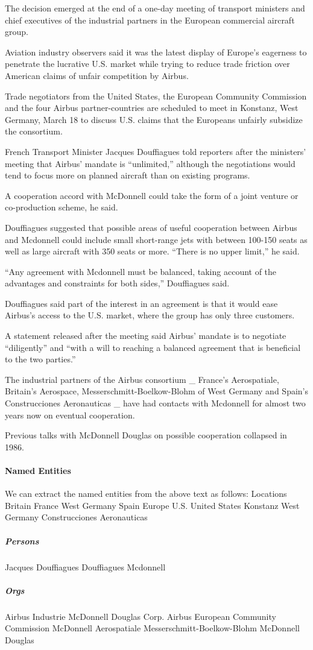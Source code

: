 \documentclass{mprop}
\begin{document}
The decision emerged at the end of a one-day meeting of transport ministers and chief executives of the industrial partners in the European commercial aircraft group.

Aviation industry observers said it was the latest display of Europe's eagerness to penetrate the lucrative U.S. market while trying to reduce trade friction over American claims of unfair competition by Airbus.

Trade negotiators from the United States, the European Community Commission and the four Airbus partner-countries are scheduled to meet in Konstanz, West Germany, March 18 to discuss U.S. claims that the Europeans unfairly subsidize the consortium.

French Transport Minister Jacques Douffiagues told reporters after the ministers' meeting that Airbus' mandate is ``unlimited,'' although the negotiations would tend to focus more on planned aircraft than on existing programs.

A cooperation accord with McDonnell could take the form of a joint venture or co-production scheme, he said.

Douffiagues suggested that possible areas of useful cooperation between Airbus and Mcdonnell could include small short-range jets with between 100-150 seats as well as large aircraft with 350 seats or more. ``There is no upper limit,'' he said.

``Any agreement with Mcdonnell must be balanced, taking account of the advantages and constraints for both sides,'' Douffiagues said.

Douffiagues said part of the interest in an agreement is that it would ease Airbus's access to the U.S. market, where the group has only three customers.

A statement released after the meeting said Airbus' mandate is to negotiate ``diligently'' and ``with a will to reaching a balanced agreement that is beneficial to the two parties.''

The industrial partners of the Airbus consortium \_ France's Aerospatiale, Britain's Aerospace, Messerschmitt-Boelkow-Blohm of West Germany and Spain's Construcciones Aeronauticas \_ have had contacts with Mcdonnell for almost two years now on eventual cooperation.

Previous talks with McDonnell Douglas on possible cooperation collapsed in 1986.

\paragraph{Named Entities}
We can extract the named entities from the above text as follows:
Locations
Britain
France
West Germany
Spain
Europe
U.S.
United States
Konstanz
West Germany
Construcciones Aeronauticas
\subparagraph{Persons}
Jacques Douffiagues
Douffiagues
Mcdonnell
\subparagraph{Orgs}
Airbus Industrie
McDonnell Douglas Corp.
Airbus
European Community Commission
McDonnell
Aerospatiale
Messerschmitt-Boelkow-Blohm
McDonnell Douglas
\end{document}

